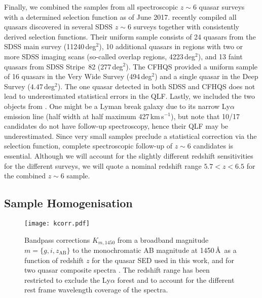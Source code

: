 \documentclass[a4paper,fleqn,usenatbib]{mnras}
\begin{document}
Finally, we combined the samples from all spectroscopic $z\sim 6$
quasar surveys with a determined selection function as of June
2017. \citet{2016ApJ...833..222J} recently compiled all quasars
discovered in several SDSS $z\sim 6$ surveys together with
consistently derived selection functions. Their uniform sample
consists of 24 quasars from the SDSS main survey (11240\,deg$^2$), 10
additional quasars in regions with two or more SDSS imaging scans
(so-called overlap regions, 4223\,deg$^2$), and 13 faint quasars from
SDSS Stripe~82 (277\,deg$^2$). The CFHQS \citep{2010AJ....139..906W}
provided a uniform sample of 16 quasars in the Very Wide Survey
(494\,deg$^2$) and a single quasar in the Deep Survey
($4.47$\,deg$^2$). The one quasar detected in both SDSS and CFHQS does
not lead to underestimated statistical errors in the QLF. Lastly, we
included the two objects from \citet{2015ApJ...798...28K}. One might
be a Lyman break galaxy due to its narrow Ly$\alpha$ emission line
(half width at half maximum 427\,km\,s$^{-1}$), but
\citet{2015ApJ...798...28K} note that 10/17 candidates do not have
follow-up spectroscopy, hence their QLF may be underestimated. Since
very small samples preclude a statistical correction via the selection
function, complete spectroscopic follow-up of $z\sim 6$ candidates is
essential. Although we will account for the slightly different
redshift sensitivities for the different surveys, we will quote a
nominal redshift range $5.7<z<6.5$ for the combined $z\sim 6$ sample.

\subsection{Sample Homogenisation}
\label{sect:datahom}

\begin{figure}
    \texttt{[image: kcorr.pdf]}
  \caption{Bandpass corrections $K_{m,1450}$ from a broadband magnitude $m=\{g,i,z_\mathrm{AB}\}$
           to the monochromatic AB magnitude at 1450\,\AA\ as a function of redshift $z$ for the \citet{2015MNRAS.449.4204L}
           quasar SED used in this work, and for two quasar composite spectra \citep{2001AJ....122..549V, 2002ApJ...565..773T}.
           The redshift range has been restricted to exclude the Ly$\alpha$ forest and to account for the different
           rest frame wavelength coverage of the spectra.}
  \label{fig:kcorr}
\end{figure}
\end{document}

